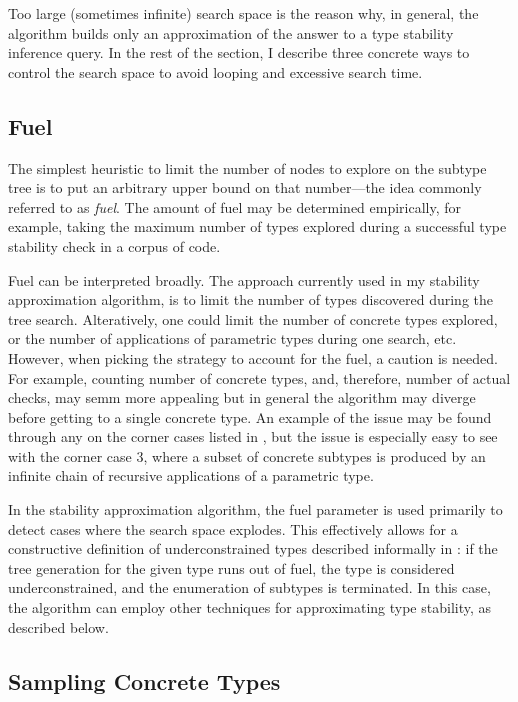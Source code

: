 Too large (sometimes infinite) search space is the reason why, in general, the
algorithm builds only an approximation of the answer to a type stability
inference query. In the rest of the section, I describe three concrete ways to
control the search space to avoid looping and excessive search time.

\subsection{Fuel}

The simplest heuristic to limit the number of nodes to explore on the subtype tree
is to put an arbitrary upper bound on that number---the idea commonly referred
to as \emph{fuel}. The amount of fuel may be determined empirically, for
example, taking the maximum number of types explored during a successful type
stability check in a corpus of code.

Fuel can be interpreted broadly.
The approach currently used in my stability
approximation algorithm, is to limit the number of types discovered during
the tree search.
Alteratively, one could limit the number of concrete
types explored, or the number of applications of parametric types during
one search, etc.
However, when picking the strategy to account for the fuel, a caution is needed.
For example, counting number of concrete types, and, therefore, number of
actual checks, may semm more appealing but in general
the algorithm may diverge before getting to a single concrete type.
An example of the issue may be found through any on the
corner cases listed in , 
but the issue is especially easy to see
with the corner case 3, where a subset of concrete subtypes is produced 
by an infinite chain of recursive applications of
a parametric type.

In the stability approximation algorithm, the fuel parameter
is used primarily to detect cases where the search space explodes.
This effectively allows for a
constructive definition of underconstrained types described informally in
: if the tree generation for the given type runs out
of fuel, the type is considered underconstrained, and the enumeration
of subtypes is terminated. In this case, the algorithm can employ other techniques
for approximating type stability, as described below.

\subsection{Sampling Concrete Types}

